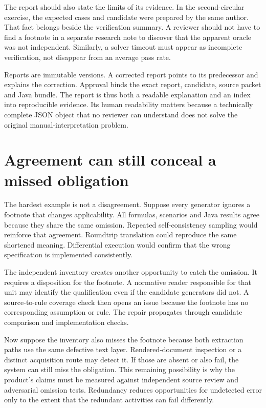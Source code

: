 The report should also state the limits of its evidence. In the second-circular
exercise, the expected cases and candidate were prepared by the same author.
That fact belongs beside the verification summary. A reviewer should not have to
find a footnote in a separate research note to discover that the apparent oracle
was not independent. Similarly, a solver timeout must appear as incomplete
verification, not disappear from an average pass rate.

Reports are immutable versions. A corrected report points to its predecessor and
explains the correction. Approval binds the exact report, candidate, source
packet and Java bundle. The report is thus both a readable explanation and an
index into reproducible evidence. Its human readability matters because a
technically complete JSON object that no reviewer can understand does not solve
the original manual-interpretation problem.

\section{Agreement can still conceal a missed obligation}

The hardest example is not a disagreement. Suppose every generator ignores a
footnote that changes applicability. All formulas, scenarios and Java results
agree because they share the same omission. Repeated self-consistency sampling
would reinforce that agreement. Roundtrip translation could reproduce the same
shortened meaning. Differential execution would confirm that the wrong
specification is implemented consistently.

The independent inventory creates another opportunity to catch the omission. It
requires a disposition for the footnote. A normative reader responsible for that
unit may identify the qualification even if the candidate generators did not.
A source-to-rule coverage check then opens an issue because the footnote has no
corresponding assumption or rule. The repair propagates through candidate
comparison and implementation checks.

Now suppose the inventory also misses the footnote because both extraction paths
use the same defective text layer. Rendered-document inspection or a distinct
acquisition route may detect it. If those are absent or also fail, the system can
still miss the obligation. This remaining possibility is why the product's
claims must be measured against independent source review and adversarial
omission tests. Redundancy reduces opportunities for undetected error only to
the extent that the redundant activities can fail differently.

